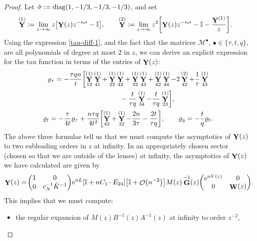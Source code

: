 \documentclass[pdftex]{sigma}
\DeclareMathOperator{\OO}{\mathcal{O}}
\DeclareMathOperator{\YY}{{\bf Y}}
\DeclareMathOperator{\WW}{{\bf W}}
\DeclareMathOperator{\GG}{{\bf G}}
\numberwithin{equation}{section}
\begin{document}
\begin{proof}
 Let $\hat{\sigma} := {\rm diag}(1,-1/3,-1/3,-1/3)$, and set
 \begin{align*}
 &\YY^{(1)} := \lim_{z\to \infty} z\bigl[\YY(z)z^{-n\hat{\sigma}} - \mathbb{I}\bigr],\qquad
 \YY^{(2)} := \lim_{z\to \infty} z^2\biggl[\YY(z)z^{-n\hat{\sigma}} - \mathbb{I} - \frac{\YY^{(1)}}{z}\biggr].
 \end{align*}
 Using the expression \eqref{tau-diff-1}, and the fact that the matrices $\mathcal{M}^{\bullet}$, $\bullet \in \{\tau,t,q\}$, are all polynomials of degree at most $2$ in $z$, we can derive an explicit expression for the tau function in terms of the entries of $\YY(z)$:
 \begin{gather*}
 \varrho_{\tau} = -\frac{\tau q n}{t}\biggl[\YY^{(1)}_{12}\YY^{(1)}_{4 1} + \YY^{(1)}_{2 2}\YY^{(1)}_{4 2} + \YY^{(1)}_{3 2}\YY^{(1)}_{4 3} + \YY^{(1)}_{42}\YY^{(1)}_{4 4} - 2\YY^{(2)}_{4 2}+ \frac{1}{\tau}\YY^{(1)}_{4 3}\\
 \hphantom{\varrho_{\tau} = -\frac{\tau q n}{t}\biggl[}{}
 - \frac{t}{\tau q}\YY^{(1)}_{34} - \frac{t}{\tau q}\YY^{(1)}_{2 3} \biggr],\\
 \varrho_t = -\frac{\tau}{4t}\varrho_{\tau} + \frac{n\tau q}{4t^2}\biggl[\YY^{(1)}_{43} + \YY^{(1)}_{32} - \frac{2n}{3\tau} - \frac{2t}{\tau q}\biggr], \qquad
 \varrho_q = -\frac{t}{q}\varrho_t.
 \end{gather*}
 The above three formulae tell us that we must compute the asymptotics of $\YY(z)$ to two subleading orders in $z$ at infinity. In an appropriately chosen sector (chosen so that we are outside of the lenses) at infinity, the asymptotics of $\YY(z)$ we have calculated are given by
 \begin{gather} \label{Y-asymptotics-final}
 \YY(z) =
 \!\begin{pmatrix}
 1 & 0\\
 0 & c_N^{-1} \hat{K}^{-1}
 \end{pmatrix}\!
 {\rm e}^{nL} [\mathbb{I} + n C_1 \cdot E_{24}] \bigl[\mathbb{I} + \OO\bigl(n^{-2}\bigr) \bigr] M(z) \GG^{-1}(z)
 \!\begin{pmatrix}
 {\rm e}^{n V(z)} & 0\\
 0 & \WW(z)
 \end{pmatrix}\!.\!\!
 \end{gather}
 This implies that we must compute:
 \begin{itemize}\itemsep=0pt\samepage
 \item the regular expansion of $M(z) B^{-1}(z)A^{-1}(z)$ at infinity to order $z^{-2}$,

\end{itemize}
\end{proof}
\end{document}
